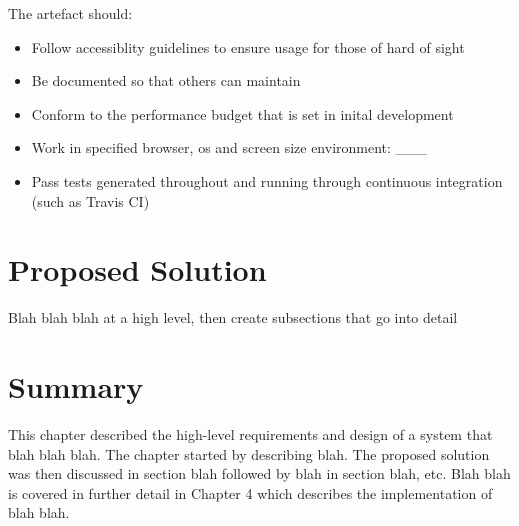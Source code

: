 The artefact should:

\begin{itemize}
  \item Follow accessiblity guidelines to ensure usage for those of hard of sight
  \item Be documented so that others can maintain
  \item Conform to the performance budget that is set in inital development
  \item Work in specified browser, os and screen size environment: ___
  \item Pass tests generated throughout and running through continuous integration (such as Travis CI)
\end{itemize}

\section{Proposed Solution} \label{a-d--proposed-solution}

Blah blah blah at a high level, then create subsections that go into detail




\section{Summary} \label{a-d--summary}

This chapter described the high-level requirements and design of a system that blah blah blah.  The chapter started by describing blah.  The proposed solution was then discussed in section blah followed by blah in section blah, etc.
Blah blah is covered in further detail in Chapter 4 which describes the implementation of blah blah.
